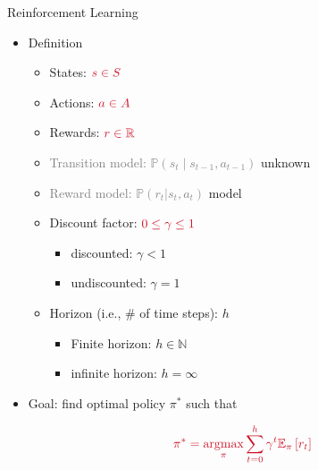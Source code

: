 \documentclass[11pt,table]{beamer}
\begin{document}
\begin{frame}{Reinforcement Learning}
    \begin{itemize}
        \item Definition
        \begin{itemize}
\item States: $\textcolor{red1}{s \in S}$
\item  Actions: $\textcolor{red1}{a \in A}$
\item  Rewards: $\textcolor{red1}{r \in \mathbb{R}}$
\item  \textcolor{gray}{Transition model: $\mathbb{P}\left(s_{t} \mid s_{t-1}, a_{t-1}\right)$} \quad\quad\quad \textcolor{red1}{unknown}
\item \textcolor{gray}{Reward model: $\mathbb{P}(r_t|s_t,a_t)$}\quad\quad\quad\quad\quad\quad\quad\; \textcolor{red1}{model}
\item  Discount factor: $\textcolor{red1}{0 \leq \gamma \leq 1}$
\begin{itemize}
	\item discounted: $\gamma<1$
  \item undiscounted: $\gamma=1$
\end{itemize}
\item  Horizon (i.e., \# of time steps): $h$
\begin{itemize}
	\item  Finite horizon: $h \in \mathbb{N}$
  \item  infinite horizon: $h=\infty$
\end{itemize}
\end{itemize}
\item Goal: \textcolor{red1}{find optimal policy $\pi^{*}$} such that

$$
\textcolor{red1}{\pi^{*}=\underset{\pi}{\operatorname{argmax}} \sum_{t=0}^{h} \gamma^{t} \mathbb{E}_{\pi}\left[r_{t}\right]}
$$ 
    \end{itemize}
		


\end{frame}
\end{document}
